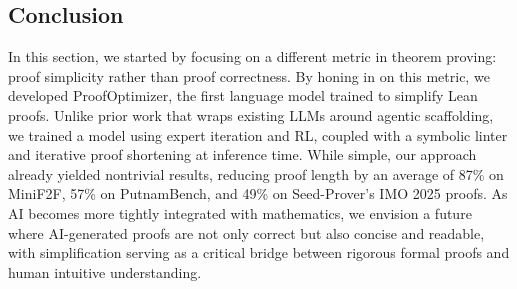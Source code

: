 \subsection{Conclusion}
In this section, we started by focusing on a different metric in theorem proving: proof simplicity
rather than proof correctness. By honing in on this metric, we developed
ProofOptimizer, the first language model trained to simplify Lean proofs.
Unlike prior work that wraps existing LLMs around agentic scaffolding, we trained a model using expert iteration and RL, coupled with a symbolic linter and iterative proof shortening at inference time.
While simple, our approach already yielded nontrivial results, reducing proof length by an average of 87\% on MiniF2F, 57\% on PutnamBench, and 49\% on Seed-Prover’s IMO 2025 proofs.
As AI becomes more tightly integrated with mathematics, we envision a future where AI-generated proofs are not only correct but also concise and readable, with simplification serving as a critical bridge between rigorous formal proofs and human intuitive understanding.

